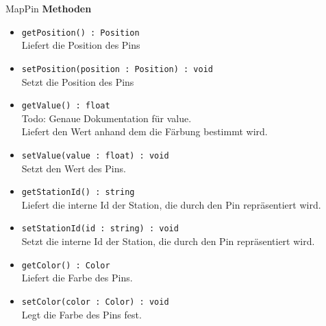     \begin{Class}{MapPin}
        \textbf{Methoden}
        \begin{itemize}
            \item \texttt{getPosition() : Position}
            \\ Liefert die Position des Pins
            \item \texttt{setPosition(position : Position) : void}
            \\ Setzt die Position des Pins

            \bigskip
            \item \texttt{getValue() : float}
            \\ Todo: Genaue Dokumentation für value.
            \\ Liefert den Wert anhand dem die Färbung bestimmt wird.
            \item \texttt{setValue(value : float) : void}
            \\ Setzt den Wert des Pins.

            \bigskip
            \item \texttt{getStationId() : string}
            \\ Liefert die interne Id der Station, die durch den Pin repräsentiert wird.
            \item \texttt{setStationId(id : string) : void}
            \\ Setzt die interne Id der Station, die durch den Pin repräsentiert wird.

            \bigskip
            \item \texttt{getColor() : Color}
            \\ Liefert die Farbe des Pins.
            \item \texttt{setColor(color : Color) : void}
            \\ Legt die Farbe des Pins fest.
        \end{itemize}
    \end{Class}
